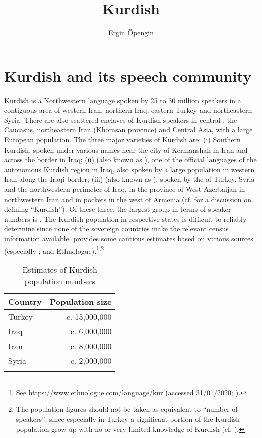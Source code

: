 \documentclass[output=paper]{langsci/langscibook}
\author{Ergin Öpengin\affiliation{University of Kurdistan-Hewlêr}}
\title{Kurdish}
\begin{document}
\maketitle

\section{Kurdish and its speech community} 

Kurdish is a Northwestern  language spoken by 25 to 30 million speakers in a contiguous area of western Iran, northern Iraq, eastern Turkey and northeastern Syria. There are also scattered enclaves of Kurdish speakers in central , the Caucasus, northeastern Iran (Khorasan province) and {Central} Asia, with a large European  population. The three major varieties of Kurdish are: (i) Southern Kurdish, spoken under various names near the city of Kermanshah in Iran and across the border in Iraq; (ii)  (also known as ), one of the official languages of the autonomous Kurdish region in Iraq, also spoken by a large population in western Iran along the Iraqi border; (iii)  (also known as ), spoken by the  of Turkey, Syria and the northwestern perimeter of Iraq, in the province of West Azerbaijan in northwestern Iran and in pockets in the west of Armenia (cf. \citealt{HaigÖpengin2014} for a discussion on defining “Kurdish”). Of these three, the largest group in terms of speaker numbers is . The Kurdish population in respective states is difficult to reliably determine since none of the sovereign countries make the relevant census information available.  provides some cautious estimates based on various sources (especially \citealt{Sirkeci2005,ZeyneloğluEtAl2016}; and Ethnologue).\footnote{See \url{https://www.ethnologue.com/language/kur} (accessed 31/01/2020; \citealt{Ethnologue}).}\textsuperscript{,}\footnote{The population figures should not be taken as equivalent to “number of speakers”, since especially in Turkey a significant portion of the Kurdish population grow up with no or very limited knowledge of Kurdish (cf. \citealt{Öpengin2012,ZeyneloğluEtAl2016}).} 

\begin{table}
\begin{tabular}{lr}
\lsptoprule
Country & Population size\\\midrule
{Turkey} & c. 15,000,000\\
{Iraq}   & c. 6,000,000\\
{Iran}   & c. 8,000,000\\
{Syria}  & c. 2,000,000\\
\lspbottomrule
\end{tabular}
\caption{Estimates of Kurdish population numbers}
\label{tab:opengin:1}
\end{table}
\end{document}
